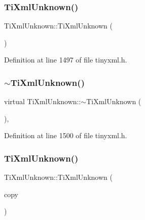 \subsubsection{\texorpdfstring{Ti\+Xml\+Unknown()}{TiXmlUnknown()}\hspace{0.1cm}{\footnotesize\ttfamily [1/2]}}
{\footnotesize\ttfamily Ti\+Xml\+Unknown\+::\+Ti\+Xml\+Unknown (\begin{DoxyParamCaption}{ }\end{DoxyParamCaption})\hspace{0.3cm}{\ttfamily [inline]}}



Definition at line 1497 of file tinyxml.\+h.

\hypertarget{class_ti_xml_unknown_ac21966c3b551553d760b4a339c9acda0}{}\label{class_ti_xml_unknown_ac21966c3b551553d760b4a339c9acda0} 
\subsubsection{\texorpdfstring{$\sim$\+Ti\+Xml\+Unknown()}{~TiXmlUnknown()}}
{\footnotesize\ttfamily virtual Ti\+Xml\+Unknown\+::$\sim$\+Ti\+Xml\+Unknown (\begin{DoxyParamCaption}{ }\end{DoxyParamCaption})\hspace{0.3cm}{\ttfamily [inline]}, {\ttfamily [virtual]}}



Definition at line 1500 of file tinyxml.\+h.

\hypertarget{class_ti_xml_unknown_abe798ff4feea31474850c7f0de6bdf5e}{}\label{class_ti_xml_unknown_abe798ff4feea31474850c7f0de6bdf5e} 
\subsubsection{\texorpdfstring{Ti\+Xml\+Unknown()}{TiXmlUnknown()}\hspace{0.1cm}{\footnotesize\ttfamily [2/2]}}
{\footnotesize\ttfamily Ti\+Xml\+Unknown\+::\+Ti\+Xml\+Unknown (\begin{DoxyParamCaption}\item[{const \hyperlink{class_ti_xml_unknown}{Ti\+Xml\+Unknown} \&}]{copy }\end{DoxyParamCaption})\hspace{0.3cm}{\ttfamily [inline]}}



